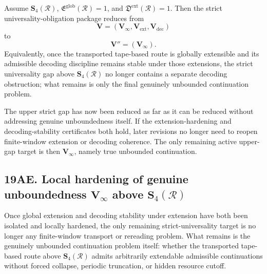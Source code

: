 \begin{proposition}
Assume \(\mathbf S_4(\mathcal R)\), \(\mathfrak E^{\mathrm{glob}}(\mathcal R)=1\), and \(\mathfrak D^{\mathrm{ext}}(\mathcal R)=1\). Then the strict universality-obligation package reduces from
\[
\mathbf V=(\mathbf V_\infty,\mathbf V_{\mathrm{ext}},\mathbf V_{\mathrm{dec}})
\]
to
\[
\mathbf V''=(\mathbf V_\infty).
\]
Equivalently, once the transported tape-based route is globally extensible and its admissible decoding discipline remains stable under those extensions, the strict universality gap above \(\mathbf S_4(\mathcal R)\) no longer contains a separate decoding obstruction; what remains is only the final genuinely unbounded continuation problem.
\end{proposition}

\begin{corollary}
The upper strict gap has now been reduced as far as it can be reduced without addressing genuine unboundedness itself. If the extension-hardening and decoding-stability certificates both hold, later revisions no longer need to reopen finite-window extension or decoding coherence. The only remaining active upper-gap target is then \(\mathbf V_\infty\), namely true unbounded continuation.
\end{corollary}


\subsection*{19AE. Local hardening of genuine unboundedness \(\mathbf V_\infty\) above \(\mathbf S_4(\mathcal R)\)}
Once global extension and decoding stability under extension have both been isolated and locally hardened, the only remaining strict-universality target is no longer any finite-window transport or rereading problem. What remains is the genuinely unbounded continuation problem itself: whether the transported tape-based route above \(\mathbf S_4(\mathcal R)\) admits arbitrarily extendable admissible continuations without forced collapse, periodic truncation, or hidden resource cutoff.

